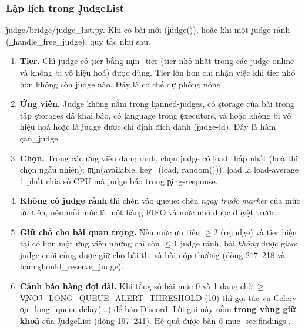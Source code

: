 \subsubsection{Lập lịch trong \texorpdfstring{\c{JudgeList}}{JudgeList}}
\f{judge/bridge/judge_list.py}. Khi có bài mới (\c{judge()}), hoặc khi một judge rảnh (\c{_handle_free_judge}), quy tắc như sau. \tS
\begin{enumerate}
\item \textbf{Tier.} Chỉ judge có \c{tier} bằng \c{min_tier} (tier nhỏ nhất trong các judge online và không bị vô hiệu hoá) được dùng. Tier lớn hơn chỉ nhận việc khi tier nhỏ hơn không còn judge nào. Đây là cơ chế dự phòng nóng.
\item \textbf{Ứng viên.} Judge không nằm trong \c{banned-judges}, có \c{storage} của bài trong tập \c{storages} đã khai báo, có \c{language} trong \c{executors}, và hoặc không bị vô hiệu hoá hoặc là judge được chỉ định đích danh (\c{judge-id}). Đây là hàm \c{can_judge}.
\item \textbf{Chọn.} Trong các ứng viên đang rảnh, chọn judge có \c{load} thấp nhất (hoà thì chọn ngẫu nhiên): \c{min(available, key=(load, random()))}. \c{load} là load-average 1 phút chia số CPU mà judge báo trong \c{ping-response}.
\item \textbf{Không có judge rảnh} thì chèn vào \c{queue}: chèn \emph{ngay trước marker} của mức ưu tiên, nên mỗi mức là một hàng FIFO và mức nhỏ được duyệt trước.
\item \textbf{Giữ chỗ cho bài quan trọng.} Nếu mức ưu tiên $\ge 2$ (rejudge) và tier hiện tại có hơn một ứng viên nhưng chỉ còn $\le 1$ judge rảnh, bài \emph{không} được giao; judge cuối cùng được giữ cho bài thi và bài nộp thường (dòng 217--218 và hàm \c{should_reserve_judge}).
\item \textbf{Cảnh báo hàng đợi dài.} Khi tổng số bài mức 0 và 1 đang chờ $\ge$ \c{VNOJ_LONG_QUEUE_ALERT_THRESHOLD} (10) thì gọi tác vụ Celery \c{on_long_queue.delay(...)} để báo Discord. Lời gọi này nằm \textbf{trong vùng giữ khoá} của \c{JudgeList} (dòng 197--241). \tI Hệ quả được bàn ở mục \ref{sec:findings}.
\end{enumerate}

